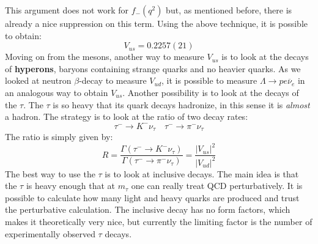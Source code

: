 \documentclass[../main.tex]{subfiles}
\begin{document}
This argument does not work for $f_-(q^2)$ but, as mentioned before, there is already a nice suppression on this term. Using the above technique, it is possible to obtain:
\[
V_{us}=0.2257(21)
\]
Moving on from the mesons, another way to measure $V_{us}$ is to look at the decays of \textbf{hyperons}, baryons containing strange quarks and no heavier quarks. As we looked at neutron $\beta$-decay to measure $V_{ud}$, it is possible to measure $\Lambda\to pe\overline{\nu}_e$ in an analogous way to obtain $V_{us}$. Another possibility is to look at the decays of the $\tau$. The $\tau$ is so heavy that its quark decays hadronize, in this sense it is \textit{almost} a hadron. The strategy is to look at the ratio of two decay rates:
\[
\tau^-\to K^-\nu_\tau \quad \tau^-\to\pi^-\nu_\tau
\]
The ratio is simply given by:
\[
R=\frac{\Gamma(\tau^-\to K^-\nu_\tau)}{\Gamma(\tau^-\to\pi^-\nu_\tau)}=\frac{|V_{us}|^2}{|V_{ud}|^2}
\]
The best way to use the $\tau$ is to look at inclusive decays. The main idea is that the $\tau$ is heavy
enough that at $m_\tau$ one can really treat QCD perturbatively. It is possible to calculate how
many light and heavy quarks are produced and trust the perturbative calculation. The inclusive
decay has no form factors, which makes it theoretically very nice, but currently the limiting factor
is the number of experimentally observed $\tau$ decays.
\end{document}
